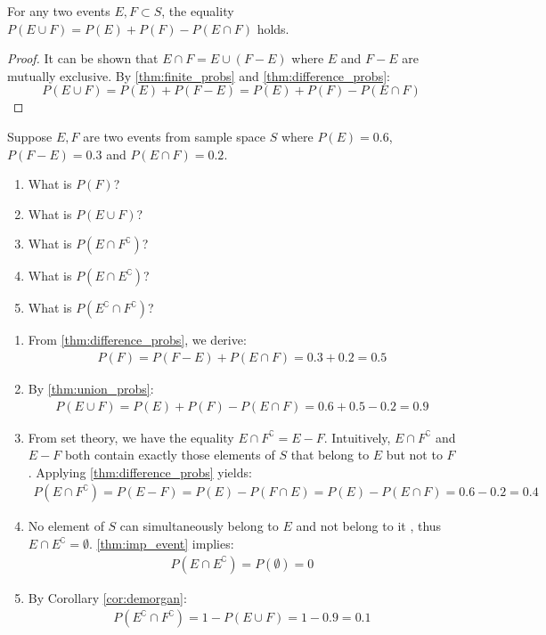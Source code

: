 \begin{theorem}\label{thm:union_probs}
	For any two events \( E, F \subset S \), the equality \( P(E \cup F) = P(E) + P(F) - P(E \cap F) \) holds.
\end{theorem}
\begin{proof}
	It can be shown that \( E \cap F = E \cup (F - E) \)
	where \( E \) and \( F - E \) are mutually exclusive.
	By \autoref{thm:finite_probs} and \autoref{thm:difference_probs}:
	\[
		P(E \cup F) = P(E) + P(F - E) = P(E) + P(F) - P(E \cap F)
	\]
\end{proof}

\begin{exmp}
	Suppose \( E, F \) are two events from sample space \( S \) where \( P(E) = 0.6 \), \( P(F - E) = 0.3 \) and \( P(E \cap F) = 0.2 \).
	\begin{enumerate}
		\item What is \( P(F) \)?
		\item What is \( P(E \cup F) \)?
		\item What is \( P(E \cap F^\complement) \)?
		\item What is \( P(E \cap E^\complement) \)?
		\item What is \( P(E^\complement \cap F^\complement) \)?
	\end{enumerate}
\end{exmp}
\begin{solution}
	\begin{enumerate}
		\item From \autoref{thm:difference_probs}, we derive:
		\begin{align*}
			P(F) = P(F - E) + P(E \cap F) = 0.3 + 0.2 = 0.5
		\end{align*}
		\item By \autoref{thm:union_probs}:
		\begin{align*}
			P(E \cup F) = P(E) + P(F) - P(E \cap F) = 0.6 + 0.5 - 0.2 = 0.9
		\end{align*}
		\item From set theory, we have the equality \( E \cap F^\complement = E - F \).
		Intuitively, \( E \cap F^\complement \) and \( E - F \) both contain exactly those elements of \( S \) that belong to \( E \) but not to \( F \).
		Applying \autoref{thm:difference_probs} yields:
		\begin{align*}
			P(E \cap F^\complement) = P(E - F) = P(E) - P(F \cap E) = P(E) - P(E \cap F) = 0.6 - 0.2 = 0.4
		\end{align*}
		\item No element of \( S \) can simultaneously belong to \( E \) and not belong to it , thus \( E \cap E^\complement = \emptyset \).
		\autoref{thm:imp_event} implies:
		\begin{align*}
			P(E \cap E^\complement ) = P(\emptyset) = 0
		\end{align*}
		\item By Corollary \autoref{cor:demorgan}:
		\begin{align*}
			P(E^\complement \cap F^\complement) = 1 - P(E \cup F) = 1 - 0.9 = 0.1
		\end{align*}
	\end{enumerate}
\end{solution}

